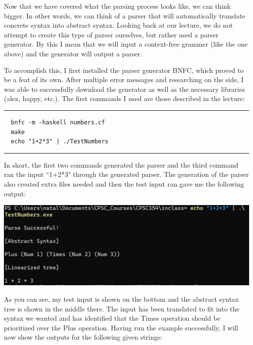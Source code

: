 \documentclass{article}
\theoremstyle{theorem}
\theoremstyle{definition}
\theoremstyle{remark}
\begin{document}
Now that we have covered what the parsing process looks like, we can think bigger. In other words, we can think of a parser that will automatically translate concrete syntax into abstract syntax. Looking back at our lecture, we do not attempt to create this type of parser ourselves, but rather 
used a parser generator. By this I mean that we will input a context-free grammer (like the one above) and the generator will output a parser.


To accomplish this, I first installed the parser generator BNFC, which proved to be a feat of its own. After multiple error messages and researching on the side, I was able to successfully download the generator as well as the necessary libraries (alex, happy, etc.). The first commands I used are those described in the 
lecture: 

\noindent
  {\color{gray} \rule{\linewidth}{0.05mm}}

\begin{verbatim}
  bnfc -m -haskell numbers.cf
  make
  echo "1+2*3" | ./TestNumbers
\end{verbatim}

\noindent
  {\color{gray} \rule{\linewidth}{0.05mm}}


In short, the first two commands generated the parser and the third command ran the input ``1+2*3" through the generated parser. 
The generation of the parser also created extra files needed and then the test input ran gave me the following output: 

\begin{center}
  \includegraphics[width=15cm]{bnfc_intro_example.png}
\end{center}

As you can see, my test input is shown on the bottom and the abstract syntax tree is shown in the middle there. The input has been translated to fit into the syntax we wanted and has identified that the Times operation should be prioritized over the Plus operation. 
Having run the example successfully, I will now show the outputs for the following given strings: 
\end{document}
